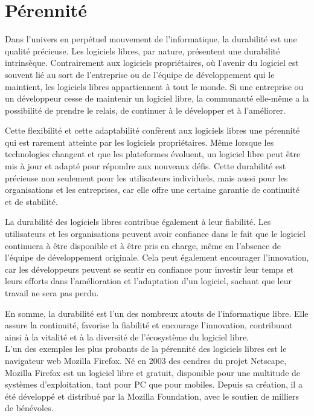\section{Pérennité}
Dans l'univers en perpétuel mouvement de l'informatique, la durabilité est une qualité précieuse. Les logiciels libres, par nature, présentent une durabilité intrinsèque. Contrairement aux logiciels propriétaires, où l'avenir du logiciel est souvent lié au sort de l'entreprise ou de l'équipe de développement qui le maintient, les logiciels libres appartiennent à tout le monde. Si une entreprise ou un développeur cesse de maintenir un logiciel libre, la communauté elle-même a la possibilité de prendre le relais, de continuer à le développer et à l'améliorer.

Cette flexibilité et cette adaptabilité confèrent aux logiciels libres une pérennité qui est rarement atteinte par les logiciels propriétaires. Même lorsque les technologies changent et que les plateformes évoluent, un logiciel libre peut être mis à jour et adapté pour répondre aux nouveaux défis. Cette durabilité est précieuse non seulement pour les utilisateurs individuels, mais aussi pour les organisations et les entreprises, car elle offre une certaine garantie de continuité et de stabilité.

La durabilité des logiciels libres contribue également à leur fiabilité. Les utilisateurs et les organisations peuvent avoir confiance dans le fait que le logiciel continuera à être disponible et à être pris en charge, même en l'absence de l'équipe de développement originale. Cela peut également encourager l'innovation, car les développeurs peuvent se sentir en confiance pour investir leur temps et leurs efforts dans l'amélioration et l'adaptation d'un logiciel, sachant que leur travail ne sera pas perdu.

En somme, la durabilité est l'un des nombreux atouts de l'informatique libre. Elle assure la continuité, favorise la fiabilité et encourage l'innovation, contribuant ainsi à la vitalité et à la diversité de l'écosystème du logiciel libre.\\

L'un des exemples les plus probants de la pérennité des logiciels libres est le navigateur web Mozilla Firefox. Né en 2003 des cendres du projet Netscape, Mozilla Firefox est un logiciel libre et gratuit, disponible pour une multitude de systèmes d'exploitation, tant pour PC que pour mobiles. Depuis sa création, il a été développé et distribué par la Mozilla Foundation, avec le soutien de milliers de bénévoles.

